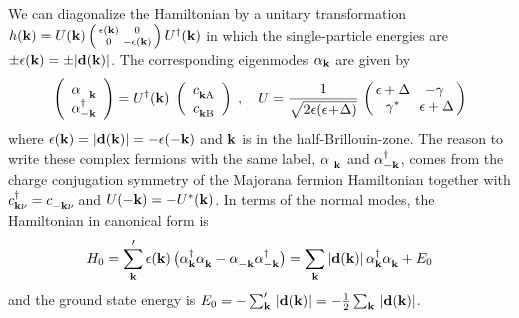 We can diagonalize the Hamiltonian by a unitary transformation $h(\mathbf{k})=U(\mathbf{k}) \left(\begin{smallmatrix} \epsilon(\mathbf{k}) & 0 \\ 0 & -\epsilon(\mathbf{k})
\end{smallmatrix}\right) U^\dagger (\mathbf{k})$ in which the single-particle energies are $\pm\epsilon(\mathbf{k})=\pm|\mathbf{d}(\mathbf{k})|$. The corresponding eigenmodes $\alpha_{\mathbf{k} }$ are given by
\begin{equation}
    \left(\begin{array}{c} \alpha_{\phantom{-}\mb{k}}^\pd \\ \alpha^\dagger_{-\mb{k}}
    \end{array}\right) = U^\dagger (\mb{k}) \;
    \left(\begin{array}{c} c_{\mb{k}\mathrm{A}}^\pd \\ c_{\mb{k}\mathrm{B}}^\pd
    \end{array}\right) \; , \quad
    U =
    \frac{1}{\sqrt{2\epsilon(\epsilon\!+\!\Delta)}}\, \left( \begin{array}{cc}
         \!\!\epsilon + \Delta\!\! & -\gamma \\
         \gamma^\ast & \epsilon +\Delta\!\!
    \end{array} \right)
\end{equation}
where $\epsilon(\mathbf{k})=|\mathbf{d}(\mathbf{k})|=-\epsilon(-\mathbf{k})$ %
and $\mathbf{k}$ is in the half-Brillouin-zone. The reason to write these complex fermions with the same label, $\alpha_{\phantom{-}\!\!\mb{k}}^\pd$ and $\alpha^\dagger_{-\mathbf{k}}$, comes from the charge conjugation symmetry %
of the Majorana fermion Hamiltonian %
together with $c_{\mb{k}\nu}^\dagger=c_{-\mb{k}\nu}^\pd\!$ and $U(-\mathbf{k})=-U^\ast (\mathbf{k})$.
In terms of the normal modes, the Hamiltonian in canonical form is
\begin{equation}
    H_0 =  \sum_{\mb{k}}^{\prime} \epsilon(\mb{k}) \, \big( \alpha^\dagger_{\mb{k}}\alpha_{\mb{k}}^\pd - \alpha_{-\mb{k}}^\pd\alpha^\dagger_{-\mb{k}} \big)
    =  \sum_{\mb{k}} |\mb{d}(\mb{k}) | \, \alpha^\dagger_{\mb{k}}\alpha_{\mb{k}}^\pd + E_0 \label{eq:k-h0}
\end{equation}
and the ground state energy is $E_0=-\sum_{\mathbf{k}}^{\prime} \,  |\mathbf{d}(\mathbf{k})|=-\frac{1}{2} \sum_{\mathbf{k}} \,  |\mathbf{d}(\mathbf{k})|$.
